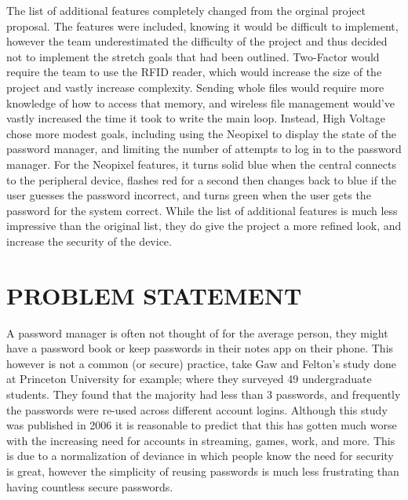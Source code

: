 \documentclass[12pt]{article}
\begin{document}
\hspace{1cm}The list of additional features completely changed from the orginal project proposal. The features were included, knowing it would be difficult to implement, however the team underestimated the difficulty of the project and thus decided not to implement the stretch goals that had been outlined. Two-Factor would require the team to use the RFID reader, which would increase the size of the project and vastly increase complexity. Sending whole files would require more knowledge of how to access that memory, and wireless file management would've vastly increased the time it took to write the main loop. Instead, High Voltage chose more modest goals, including using the Neopixel to display the state of the password manager, and limiting the number of attempts to log in to the password manager. For the Neopixel features, it turns solid blue when the central connects to the peripheral device, flashes red for a second then changes back to blue if the user guesses the password incorrect, and turns green when the user gets the password for the system correct. While the list of additional features is much less impressive than the original list, they do give the project a more refined look, and increase the security of the device.

\section{PROBLEM STATEMENT}
\hspace{1cm}A password manager is often not thought of for the average person, they might have a password book or keep passwords in their notes app on their phone. This however is not a common (or secure) practice, take Gaw and Felton's study \cite{passw-strats} done at Princeton University for example; where they surveyed 49 undergraduate students. They found that the majority had less than 3 passwords, and frequently the passwords were re-used across different account logins. Although this study was published in 2006 it is reasonable to predict that this has gotten much worse with the increasing need for accounts in streaming, games, work, and more. This is due to a normalization of deviance in which people know the need for security is great, however the simplicity of reusing passwords is much less frustrating than having countless secure passwords. 
\end{document}
